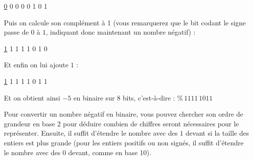 \documentclass[11pt,a4paper]{article}
\begin{document}
\medskip

{ \underline{0} \hspace*{0.2cm} 0 \hspace*{0.2cm} 0 \hspace*{0.2cm} 0 \hspace*{0.2cm} 0 \hspace*{0.2cm} 1 \hspace*{0.2cm} 0 \hspace*{0.2cm} 1 }

\medskip

Puis on calcule son complément à 1 (vous remarquerez que le bit codant le signe passe de $ 0 $ à $ 1 $, indiquant donc maintenant un nombre négatif) :

\medskip

{ \underline{1} \hspace*{0.2cm} 1 \hspace*{0.2cm} 1 \hspace*{0.2cm} 1 \hspace*{0.2cm} 1 \hspace*{0.2cm} 0 \hspace*{0.2cm} 1 \hspace*{0.2cm} 0 }

\medskip

Et enfin on lui ajoute $ 1 $ :

\medskip

{ \underline{1} \hspace*{0.2cm} 1 \hspace*{0.2cm} 1 \hspace*{0.2cm} 1 \hspace*{0.2cm} 1 \hspace*{0.2cm} 0 \hspace*{0.2cm} 1 \hspace*{0.2cm} 1 }

\medskip

Et on obtient ainsi $ -5 $ en binaire sur 8 bits, c'est-à-dire : $ \% \, 1111 \, 1011 $

\bigskip

Pour convertir un nombre négatif en binaire, vous pouvez chercher son ordre de grandeur en base 2 pour déduire combien de chiffres seront nécessaires pour le représenter.
Ensuite, il suffit d'étendre le nombre avec des $ 1 $ devant si la taille des entiers est plus grande (pour les entiers positifs ou non signés, il suffit d'étendre le nombre avec des $ 0 $ devant, comme en base 10).

\bigskip
\end{document}
